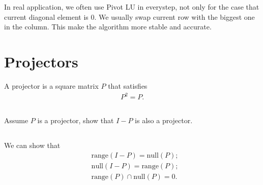 \documentclass{article}%
\begin{document}
In real application, we often use Pivot LU in everystep, not only for the case that current diagonal element is 0. We usually swap current row with the biggest one in the column. This make the algorithm more stable and accurate. 



\section{Projectors}
A projector is a square matrix $ P$ that satisfies
\begin{align*}
     P^2 =  P.
\end{align*}

\subsection{}
Assume $ P$ is a projector, show that $ I- P$ is also a projector.

\subsection{}
We can show that
\begin{align*}
    & \text{range}(  I-  P) = \text{null}(  P);\\
    & \text{null}(  I-  P) = \text{range}(  P);\\
    & \text{range}(  P) \cap \text{null}(  P) = 0.
\end{align*}
\end{document}
